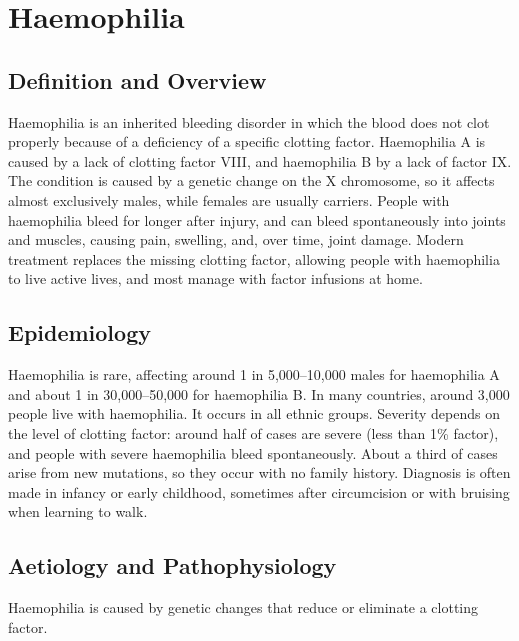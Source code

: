 \chapter{Haemophilia}

\section*{Definition and Overview}
Haemophilia is an inherited bleeding disorder in which the blood does not clot properly because of a deficiency of a specific clotting factor. Haemophilia A is caused by a lack of clotting factor VIII, and haemophilia B by a lack of factor IX. The condition is caused by a genetic change on the X chromosome, so it affects almost exclusively males, while females are usually carriers. People with haemophilia bleed for longer after injury, and can bleed spontaneously into joints and muscles, causing pain, swelling, and, over time, joint damage. Modern treatment replaces the missing clotting factor, allowing people with haemophilia to live active lives, and most manage with factor infusions at home.

\section*{Epidemiology}
Haemophilia is rare, affecting around 1 in 5,000--10,000 males for haemophilia A and about 1 in 30,000--50,000 for haemophilia B. In many countries, around 3,000 people live with haemophilia. It occurs in all ethnic groups. Severity depends on the level of clotting factor: around half of cases are severe (less than 1\% factor), and people with severe haemophilia bleed spontaneously. About a third of cases arise from new mutations, so they occur with no family history. Diagnosis is often made in infancy or early childhood, sometimes after circumcision or with bruising when learning to walk.

\section*{Aetiology and Pathophysiology}
Haemophilia is caused by genetic changes that reduce or eliminate a clotting factor.

